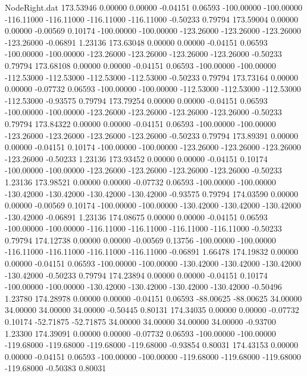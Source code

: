 \begin{filecontents}{NodeRight.dat}
 173.53946    0.00000    0.00000    -0.04151    0.06593 -100.00000 -100.00000 -116.11000 -116.11000 -116.11000 -116.11000   -0.50233    0.79794
 173.59004    0.00000    0.00000    -0.00569    0.10174 -100.00000 -100.00000 -123.26000 -123.26000 -123.26000 -123.26000   -0.06891    1.23136
 173.63048    0.00000    0.00000    -0.04151    0.06593 -100.00000 -100.00000 -123.26000 -123.26000 -123.26000 -123.26000   -0.50233    0.79794
 173.68108    0.00000    0.00000    -0.04151    0.06593 -100.00000 -100.00000 -112.53000 -112.53000 -112.53000 -112.53000   -0.50233    0.79794
 173.73164    0.00000    0.00000    -0.07732    0.06593 -100.00000 -100.00000 -112.53000 -112.53000 -112.53000 -112.53000   -0.93575    0.79794
 173.79254    0.00000    0.00000    -0.04151    0.06593 -100.00000 -100.00000 -123.26000 -123.26000 -123.26000 -123.26000   -0.50233    0.79794
 173.84322    0.00000    0.00000    -0.04151    0.06593 -100.00000 -100.00000 -123.26000 -123.26000 -123.26000 -123.26000   -0.50233    0.79794
 173.89391    0.00000    0.00000    -0.04151    0.10174 -100.00000 -100.00000 -123.26000 -123.26000 -123.26000 -123.26000   -0.50233    1.23136
 173.93452    0.00000    0.00000    -0.04151    0.10174 -100.00000 -100.00000 -123.26000 -123.26000 -123.26000 -123.26000   -0.50233    1.23136
 173.98521    0.00000    0.00000    -0.07732    0.06593 -100.00000 -100.00000 -130.42000 -130.42000 -130.42000 -130.42000   -0.93575    0.79794
 174.03590    0.00000    0.00000    -0.00569    0.10174 -100.00000 -100.00000 -130.42000 -130.42000 -130.42000 -130.42000   -0.06891    1.23136
 174.08675    0.00000    0.00000    -0.04151    0.06593 -100.00000 -100.00000 -116.11000 -116.11000 -116.11000 -116.11000   -0.50233    0.79794
 174.12738    0.00000    0.00000    -0.00569    0.13756 -100.00000 -100.00000 -116.11000 -116.11000 -116.11000 -116.11000   -0.06891    1.66478
 174.19832    0.00000    0.00000    -0.04151    0.06593 -100.00000 -100.00000 -130.42000 -130.42000 -130.42000 -130.42000   -0.50233    0.79794
 174.23894    0.00000    0.00000    -0.04151    0.10174 -100.00000 -100.00000 -130.42000 -130.42000 -130.42000 -130.42000   -0.50496    1.23780
 174.28978    0.00000    0.00000    -0.04151    0.06593  -88.00625  -88.00625   34.00000   34.00000   34.00000   34.00000   -0.50445    0.80131
 174.34035    0.00000    0.00000    -0.07732    0.10174  -52.71875  -52.71875   34.00000   34.00000   34.00000   34.00000   -0.93700    1.23300
 174.39091    0.00000    0.00000    -0.07732    0.06593 -100.00000 -100.00000 -119.68000 -119.68000 -119.68000 -119.68000   -0.93854    0.80031
 174.43153    0.00000    0.00000    -0.04151    0.06593 -100.00000 -100.00000 -119.68000 -119.68000 -119.68000 -119.68000   -0.50383    0.80031

\end{filecontents}
